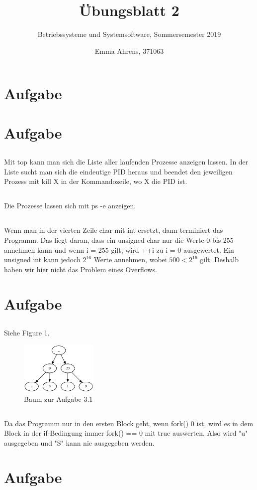 \documentclass{scrartcl}
\title{Übungsblatt 2}
\subtitle{Betriebssysteme und Systemsoftware, Sommersemester 2019}
\author{ \and Emma Ahrens, 371063}
\begin{document}
\maketitle

\section{Aufgabe}

\section{Aufgabe}

\subsection{}
Mit top kann man sich die Liste aller laufenden Prozesse anzeigen lassen. In der Liste sucht man sich die eindeutige PID heraus und beendet den jeweiligen Prozess mit kill X in der Kommandozeile, wo X die PID ist.

\subsection{}
Die Prozesse lassen sich mit ps -e anzeigen.

\subsection{}
Wenn man in der vierten Zeile char mit int ersetzt, dann terminiert das Programm.
Das liegt daran, dass ein unsigned char nur die Werte 0 bis 255 annehmen kann und wenn i = 255 gilt, wird ++i zu i = 0 ausgewertet. Ein unsigned int kann jedoch $2^{16}$ Werte annehmen, wobei $500 < 2^{16}$ gilt. Deshalb haben wir hier nicht das Problem eines Overflows. 

\section{Aufgabe}

\subsection{}
Siehe Figure 1.

\begin{figure}[ht]
	\centering
	\includegraphics[width=0.33\textwidth]{Prozessbaum.png}
	\caption{Baum zur Aufgabe 3.1}
\end{figure}

\subsection{}
Da das Programm nur in den ersten Block geht, wenn fork() 0 ist, wird es in dem Block in der if-Bedingung immer fork() == 0 mit true auswerten. Also wird "u" ausgegeben und "S" kann nie ausgegeben werden.

\section{Aufgabe}
\end{document}
